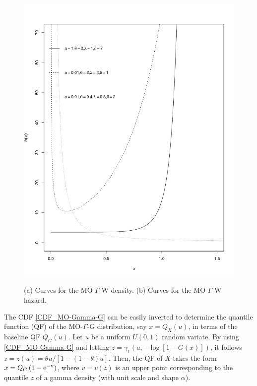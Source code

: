\documentclass[12pt,a4paper]{article} %
\begin{document}
\begin{figure}[H]
\begin{center}
\includegraphics[scale=.3]{hazard.pdf}\\
\vspace{-0.5cm}
\caption{(a) Curves for the MO-$\Gamma$-W density. (b) Curves for the MO-$\Gamma$-W hazard.\label{formas}}
\end{center}
\end{figure}

\vspace{0.6cm}

The CDF \eqref{CDF_MO-Gamma-G} can be easily inverted to determine the quantile function (QF) of the MO-$\Gamma$-G distribution,
say $x=Q_{X}(u)$, in terms of the baseline QF $Q_G(u)$. Let $u$ be a uniform $U(0,1)$ random variate. By using \eqref{CDF_MO-Gamma-G}
and letting $z=\gamma_{1}\left(a, -\log[1-G(x)]\right)$, it follows $z=z(u)=\theta u/[1-(1-\theta)u]$.
Then, the QF of $X$ takes the form $x=Q_G\left(1-\rm{e}^{-v}\right)$, where $v=v(z)$ is an upper point
corresponding to the quantile $z$ of a gamma density (with unit scale and shape $\alpha$).
\end{document}
